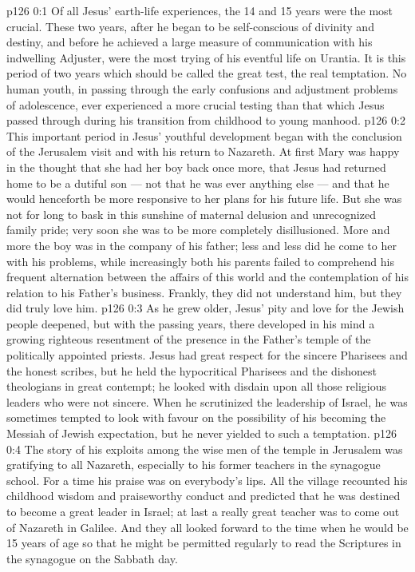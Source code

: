 \author{Midwayer Commission}
\vs p126 0:1 Of all Jesus’ earth\hyp{}life experiences, the 14 and 15 years were the most crucial. These two years, after he began to be self\hyp{}conscious of divinity and destiny, and before he achieved a large measure of communication with his indwelling Adjuster, were the most trying of his eventful life on Urantia. It is this period of two years which should be called the great test, the real temptation. No human youth, in passing through the early confusions and adjustment problems of adolescence, ever experienced a more crucial testing than that which Jesus passed through during his transition from childhood to young manhood.
\vs p126 0:2 This important period in Jesus’ youthful development began with the conclusion of the Jerusalem visit and with his return to Nazareth. At first Mary was happy in the thought that she had her boy back once more, that Jesus had returned home to be a dutiful son --- not that he was ever anything else --- and that he would henceforth be more responsive to her plans for his future life. But she was not for long to bask in this sunshine of maternal delusion and unrecognized family pride; very soon she was to be more completely disillusioned. More and more the boy was in the company of his father; less and less did he come to her with his problems, while increasingly both his parents failed to comprehend his frequent alternation between the affairs of this world and the contemplation of his relation to his Father’s business. Frankly, they did not understand him, but they did truly love him.
\vs p126 0:3 \pc As he grew older, Jesus’ pity and love for the Jewish people deepened, but with the passing years, there developed in his mind a growing righteous resentment of the presence in the Father’s temple of the politically appointed priests. Jesus had great respect for the sincere Pharisees and the honest scribes, but he held the hypocritical Pharisees and the dishonest theologians in great contempt; he looked with disdain upon all those religious leaders who were not sincere. When he scrutinized the leadership of Israel, he was sometimes tempted to look with favour on the possibility of his becoming the Messiah of Jewish expectation, but he never yielded to such a temptation.
\vs p126 0:4 \pc The story of his exploits among the wise men of the temple in Jerusalem was gratifying to all Nazareth, especially to his former teachers in the synagogue school. For a time his praise was on everybody’s lips. All the village recounted his childhood wisdom and praiseworthy conduct and predicted that he was destined to become a great leader in Israel; at last a really great teacher was to come out of Nazareth in Galilee. And they all looked forward to the time when he would be 15 years of age so that he might be permitted regularly to read the Scriptures in the synagogue on the Sabbath day.
